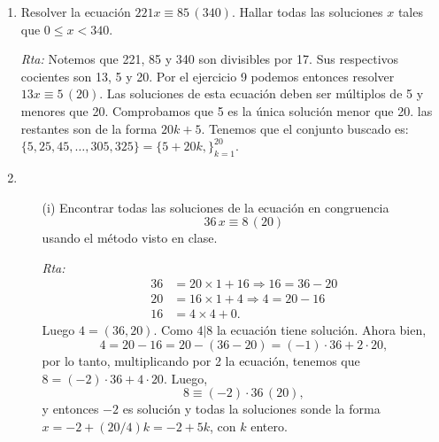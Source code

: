 \documentclass[12pt,spanish,makeidx]{amsbook}
\newcommand{\rta}{\noindent\textit{Rta: }}
\newcommand{\md}[1]{{\,}\left(#1\right)}
\begin{document}
\begin{enumerate}
\begin{enumerate}
		\rta  $-12 \equiv 2 \md{7}$, por lo tanto la ecuación es equivalente a $2x \equiv 2 \md{7}$. Evidentemente 1 es solución de la ecuación y como $1=(2,7)$ todas las soluciones son de la forma $x=1+7k, k\in\mathbb{Z}$.
		
		\item $3x \equiv 5 \md{4}.$
		
		\rta   $5 \equiv 1 \md{4}$, por lo tanto la ecuación es equivalente a $3x \equiv 1 \md{4}$. Probando se encuentra que 3 es solución y como $1=(4,3)$, todas las soluciones son de la forma $x=3+4k, k\in\mathbb{Z}$.
	\end{enumerate}

	\smallskip
	\item Resolver la ecuación $221 x \equiv 85\md{340}$. Hallar todas las soluciones $x$ tales que $0 \le x < 340$.
		
	\rta Notemos que 221, 85 y 340 son divisibles por 17.  Sus respectivos cocientes son 13, 5 y 20.
	Por el ejercicio 9 podemos entonces resolver $13x\equiv 5 \md{20}$. Las soluciones de esta ecuación deben ser múltiplos de 5 y menores que 20. Comprobamos que 5 es la única solución menor que 20.
	las restantes son de la forma $20k+5$. Tenemos que el conjunto buscado es: $\{5, 25, 45, \dots,305, 325\}=\{5+20k,\}_{k=1}^{20}$.
	
	\smallskip
	\item 
	\begin{enumerate}
		\item[(i)] Encontrar todas las soluciones de la ecuación en congruencia
		$$36\,x\equiv 8 \md{20}$$
		usando el método visto en clase.
			
		\rta 
		\begin{align*}
			36 &= 20 \times 1 + 16 \Rightarrow 16 = 36 -20\\
			20 &= 16 \times 1 + 4 \Rightarrow 4 = 20 -16 \\
			16 &= 4 \times 4 + 0.
		\end{align*}
		Luego $4 = (36,20)$. Como $4|8$ la ecuación tiene solución. Ahora bien,  
		\begin{equation*}
			4 = 20 -16 = 20 - (36 -20) = (-1)\cdot 36 + 2 \cdot 20,
		\end{equation*}
		por lo tanto, multiplicando por 2 la ecuación, tenemos que $8 = (-2) \cdot 36 + 4 \cdot 20$. Luego, 
		\begin{equation*}
			8 \equiv  (-2)\cdot 36\md{20},
		\end{equation*}
		y entonces $-2$ es solución y todas la soluciones sonde la forma $x = -2 + (20/4)k= -2 +5k$, con $k$ entero. 
		

\end{enumerate}
\end{enumerate}
\end{document}
